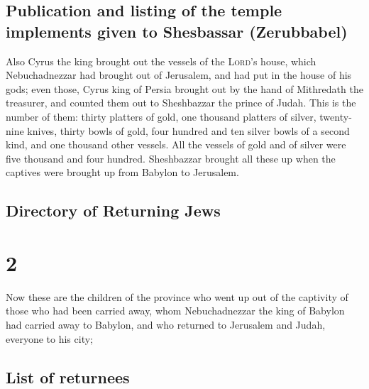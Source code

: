 \hypertarget{publication-and-listing-of-the-temple-implements-given-to-shesbassar-zerubbabel}{%
\subsection{Publication and listing of the temple implements given to
Shesbassar
(Zerubbabel)}\label{publication-and-listing-of-the-temple-implements-given-to-shesbassar-zerubbabel}}

 Also Cyrus the king brought out the vessels of the
\textsc{Lord}'s house, which Nebuchadnezzar had brought out of
Jerusalem, and had put in the house of his gods;  even
those, Cyrus king of Persia brought out by the hand of Mithredath the
treasurer, and counted them out to Sheshbazzar the prince of Judah.
 This is the number of them: thirty platters of gold, one
thousand platters of silver, twenty-nine knives,  thirty
bowls of gold, four hundred and ten silver bowls of a second kind, and
one thousand other vessels.  All the vessels of gold and
of silver were five thousand and four hundred. Sheshbazzar brought all
these up when the captives were brought up from Babylon to Jerusalem.

\hypertarget{directory-of-returning-jews}{%
\subsection{Directory of Returning
Jews}\label{directory-of-returning-jews}}

\hypertarget{section-1}{%
\section{2}\label{section-1}}

 Now these are the children of the province who went up
out of the captivity of those who had been carried away, whom
Nebuchadnezzar the king of Babylon had carried away to Babylon, and who
returned to Jerusalem and Judah, everyone to his city;

\hypertarget{list-of-returnees}{%
\subsection{List of returnees}\label{list-of-returnees}}

